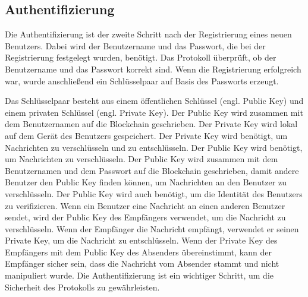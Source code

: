 \subsection{Authentifizierung}

Die Authentifizierung ist der zweite Schritt nach der Registrierung eines neuen Benutzers. 
Dabei wird der Benutzername und das Passwort, die bei der Registrierung festgelegt wurden,
benötigt. Das Protokoll überprüft, ob der Benutzername und das Passwort korrekt sind. %
Wenn die Registrierung erfolgreich war, wurde anschließend ein Schlüsselpaar auf Basis des Passworts erzeugt.

Das Schlüsselpaar besteht aus einem öffentlichen Schlüssel (engl. Public Key) und einem privaten Schlüssel 
(engl. Private Key). Der Public Key wird zusammen mit
dem Benutzernamen auf die Blockchain geschrieben. Der Private Key wird lokal auf dem
Gerät des Benutzers gespeichert. Der Private Key wird benötigt, um Nachrichten zu verschlüsseln und
zu entschlüsseln. Der Public Key wird benötigt, um Nachrichten zu verschlüsseln. Der Public Key wird
zusammen mit dem Benutzernamen und dem Passwort auf die Blockchain geschrieben, damit andere Benutzer
den Public Key finden können, um Nachrichten an den Benutzer zu verschlüsseln. Der Public Key wird
auch benötigt, um die Identität des Benutzers zu verifizieren. Wenn ein Benutzer eine Nachricht an
einen anderen Benutzer sendet, wird der Public Key des Empfängers verwendet, um die Nachricht zu
verschlüsseln. Wenn der Empfänger die Nachricht empfängt, verwendet er seinen Private Key, um die
Nachricht zu entschlüsseln. Wenn der Private Key des Empfängers mit dem Public Key des Absenders
übereinstimmt, kann der Empfänger sicher sein, dass die Nachricht vom Absender stammt und nicht
manipuliert wurde.
Die Authentifizierung ist ein wichtiger Schritt, um die Sicherheit des Protokolls zu gewährleisten.